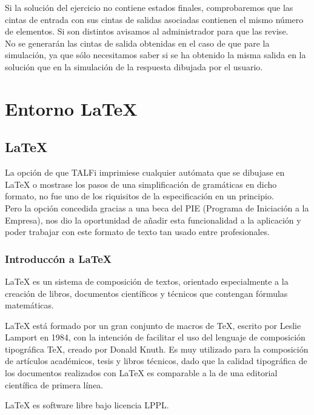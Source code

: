 \documentclass[12pt,a4paper,spanish]{book}
\begin{document}
Si la soluci\'on del ejercicio no contiene estados finales, comprobaremos que las cintas de entrada con sus cintas de salidas asociadas contienen el mismo n\'umero de elementos. Si son distintos avisamos al administrador para que las revise.\\
No se generar\'an las cintas de salida obtenidas en el caso de que pare la simulaci\'on, ya que s\'olo necesitamos saber si se ha obtenido la misma salida en la soluci\'on que en la simulaci\'on de la respuesta dibujada por el usuario.


\chapter{Entorno \LaTeX{}}
\section{\LaTeX{}}

La opci\'on de que TALFi imprimiese cualquier aut\'omata que se dibujase en {\LaTeX{}} o mostrase los pasos de una simplificaci\'on de gram\'aticas en dicho formato, no fue uno de los riquisitos de la especificaci\'on en un principio.\\
Pero la opci\'on concedida gracias a una beca del PIE (Programa de Iniciaci\'on a la Empresa), nos dio la oportunidad de a\~nadir esta funcionalidad a la aplicaci\'on y poder trabajar con este formato de texto tan usado entre profesionales.\\
\subsection{Introducc\'on a \LaTeX{}}
\LaTeX{} es un sistema de composici\'on de textos, orientado especialmente a la creaci\'on de libros, documentos cient\'ificos y t\'ecnicos que contengan f\'ormulas matem\'aticas.

\LaTeX{} est\'a formado por un gran conjunto de macros de \TeX{}, escrito por Leslie Lamport en 1984, con la intenci\'on de facilitar el uso del lenguaje de composici\'on tipogr\'afica \TeX{}, creado por Donald Knuth. Es muy utilizado para la composici\'on de art\'iculos acad\'emicos, tesis y libros t\'ecnicos, dado que la calidad tipogr\'afica de los documentos realizados con \LaTeX{} es comparable a la de una editorial cient\'ifica de primera l\'inea.

\LaTeX{} es software libre bajo licencia LPPL.
\end{document}
